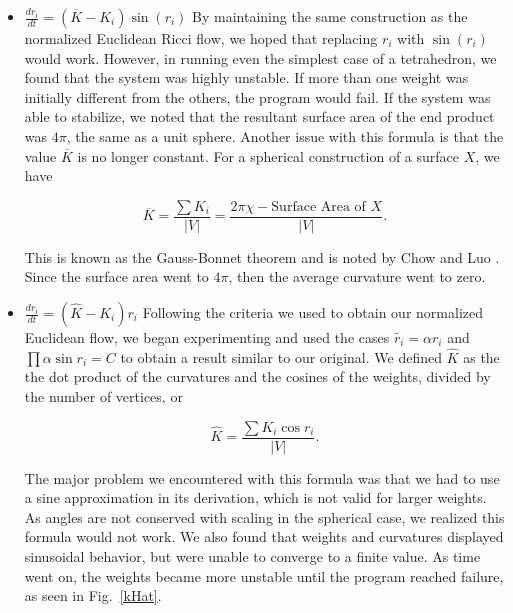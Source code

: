 \documentclass[12pt]{article}
\begin{document}
\begin{itemize}
\item $\displaystyle \frac{dr_i}{dt} = (\overline{K} - K_i)\sin(r_i)$ \newline
\noindent By maintaining the same construction as the normalized Euclidean Ricci flow, we hoped that replacing $r_i$ with $\sin(r_i)$ would work. However, in running even the simplest case of a tetrahedron, we found that the system was highly unstable. If more than one weight was initially different from the others, the program would fail. If the system was able to stabilize, we noted that the resultant surface area of the end product was $4\pi$, the same as a unit sphere. Another issue with this formula is that the value $\overline{K}$ is no longer constant. For a spherical construction of a surface $X$, we have 

$$\overline{K} = \frac{\sum{K_i}}{|V|} = \frac{2\pi\chi - \mbox{Surface Area of }X}{|V|}.$$

\noindent This is known as the Gauss-Bonnet theorem and is noted by Chow and Luo \cite{chowluo}. Since the surface area went to $4\pi$, then the average curvature went to zero. 

\item $\displaystyle \frac{dr_i}{dt} = (\hat{K} - K_i)r_i$ \newline
\noindent Following the criteria we used to obtain our normalized Euclidean flow, we began experimenting and used the cases $\tilde{r_i} = \alpha r_i$ and $\prod{\alpha \sin r_i} = C$ to obtain a result similar to our original. We defined $\hat{K}$ as the the dot product of the curvatures and the cosines of the weights, divided by the number of vertices, or 

$$\hat{K} = \frac{\sum{K_i \cos r_i}}{|V|}.$$

\noindent The major problem we encountered with this formula was that we had to use a sine approximation in its derivation, which is not valid for larger weights. As angles are not conserved with scaling in the spherical case, we realized this formula would not work. We also found that weights and curvatures displayed sinusoidal behavior, but were unable to converge to a finite value. As time went on, the weights became more unstable until the program reached failure, as seen in Fig.~\ref{kHat}.


\end{itemize}
\end{document}
